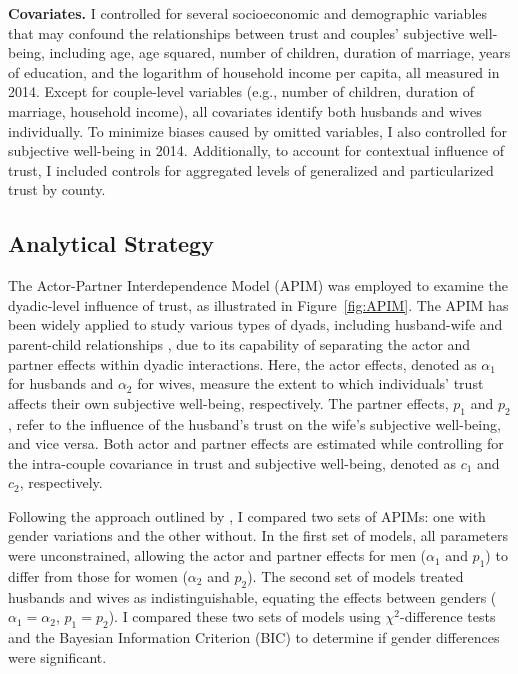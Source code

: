 \textbf{Covariates.} I controlled for several socioeconomic and demographic variables that may confound the relationships between trust and couples' subjective well-being, including age, age squared, number of children, duration of marriage, years of education, and the logarithm of household income per capita, all measured in 2014. Except for couple-level variables (e.g., number of children, duration of marriage, household income), all covariates identify both husbands and wives individually. To minimize biases caused by omitted variables, I also controlled for subjective well-being in 2014. Additionally, to account for contextual influence of trust, I included controls for aggregated levels of generalized and particularized trust by county.

\subsection{Analytical Strategy}

The Actor-Partner Interdependence Model (APIM) was employed to examine the dyadic-level influence of trust, as illustrated in Figure~\ref{fig:APIM}. The APIM has been widely applied to study various types of dyads, including husband-wife and parent-child relationships \parencite{kennyReflectionsActorpartnerInterdependence2018}, due to its capability of separating the actor and partner effects within dyadic interactions. Here, the actor effects, denoted as $\alpha_1$ for husbands and $\alpha_2$ for wives, measure the extent to which individuals' trust affects their own subjective well-being, respectively. The partner effects, $p_1$ and $p_2$, refer to the influence of the husband's trust on the wife's subjective well-being, and vice versa. Both actor and partner effects are estimated while controlling for the intra-couple covariance in trust and subjective well-being, denoted as $c_1$ and $c_2$, respectively.

Following the approach outlined by \textcite{kennyReflectionsActorpartnerInterdependence2018}, I compared two sets of APIMs: one with gender variations and the other without. In the first set of models, all parameters were unconstrained, allowing the actor and partner effects for men ($\alpha_1$ and $p_1$) to differ from those for women ($\alpha_2$ and $p_2$). The second set of models treated husbands and wives as indistinguishable, equating the effects between genders ($\alpha_1=\alpha_2$, $p_1=p_2$). I compared these two sets of models using $\chi^2$-difference tests and the Bayesian Information Criterion (BIC) to determine if gender differences were significant.

